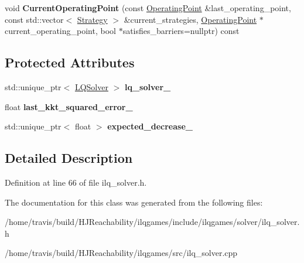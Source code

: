 \begin{DoxyCompactItemize}
\item 
void {\bfseries Current\+Operating\+Point} (const \hyperlink{structilqgames_1_1_operating_point}{Operating\+Point} \&last\+\_\+operating\+\_\+point, const std\+::vector$<$ \hyperlink{structilqgames_1_1_strategy}{Strategy} $>$ \&current\+\_\+strategies, \hyperlink{structilqgames_1_1_operating_point}{Operating\+Point} $\ast$current\+\_\+operating\+\_\+point, bool $\ast$satisfies\+\_\+barriers=nullptr) const \hypertarget{classilqgames_1_1_i_l_q_solver_ae5dd6b941a6caa2091547e27b7ca8869}{}\label{classilqgames_1_1_i_l_q_solver_ae5dd6b941a6caa2091547e27b7ca8869}

\end{DoxyCompactItemize}
\subsection*{Protected Attributes}
\begin{DoxyCompactItemize}
\item 
std\+::unique\+\_\+ptr$<$ \hyperlink{classilqgames_1_1_l_q_solver}{L\+Q\+Solver} $>$ {\bfseries lq\+\_\+solver\+\_\+}\hypertarget{classilqgames_1_1_i_l_q_solver_afb4b2fed2450e965d347dd6a38a33bb6}{}\label{classilqgames_1_1_i_l_q_solver_afb4b2fed2450e965d347dd6a38a33bb6}

\item 
float {\bfseries last\+\_\+kkt\+\_\+squared\+\_\+error\+\_\+}\hypertarget{classilqgames_1_1_i_l_q_solver_aad3c6e1b11d4c17ff63d87b3755c11b9}{}\label{classilqgames_1_1_i_l_q_solver_aad3c6e1b11d4c17ff63d87b3755c11b9}

\item 
std\+::unique\+\_\+ptr$<$ float $>$ {\bfseries expected\+\_\+decrease\+\_\+}\hypertarget{classilqgames_1_1_i_l_q_solver_a58f9f117f6c03931c46d4ccece3386c7}{}\label{classilqgames_1_1_i_l_q_solver_a58f9f117f6c03931c46d4ccece3386c7}

\end{DoxyCompactItemize}


\subsection{Detailed Description}


Definition at line 66 of file ilq\+\_\+solver.\+h.



The documentation for this class was generated from the following files\+:\begin{DoxyCompactItemize}
\item 
/home/travis/build/\+H\+J\+Reachability/ilqgames/include/ilqgames/solver/ilq\+\_\+solver.\+h\item 
/home/travis/build/\+H\+J\+Reachability/ilqgames/src/ilq\+\_\+solver.\+cpp\end{DoxyCompactItemize}
